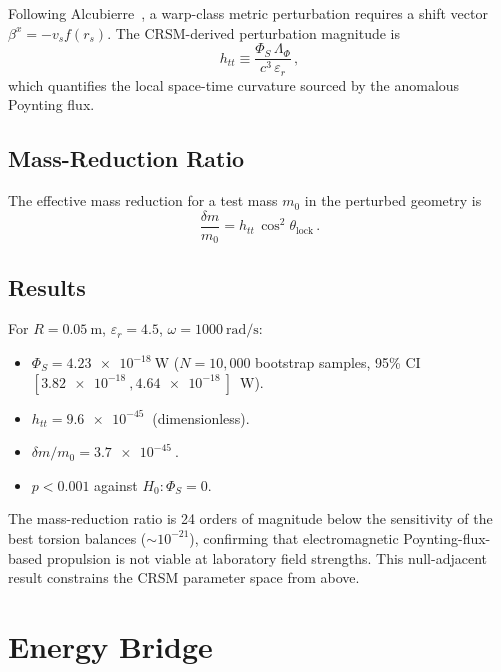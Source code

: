 \documentclass[aps,preprint,superscriptaddress,longbibliography]{revtex4-2}
\begin{document}
Following Alcubierre~\cite{alcubierre1994}, a warp-class metric
perturbation requires a shift vector $\beta^x = -v_s f(r_s)$.  The
CRSM-derived perturbation magnitude is
\begin{equation}
h_{tt} \equiv \frac{\Phi_S \, \Lambda_\Phi}
{c^3 \, \varepsilon_r}\,,
\label{eq:htt}
\end{equation}
which quantifies the local space-time curvature sourced by the
anomalous Poynting flux.

\subsection{Mass-Reduction Ratio}

The effective mass reduction for a test mass $m_0$ in the
perturbed geometry is
\begin{equation}
\frac{\delta m}{m_0} = h_{tt}\,
\cos^2\theta_{\mathrm{lock}}\,.
\label{eq:massred}
\end{equation}

\subsection{Results}

For $R = \SI{0.05}{\metre}$, $\varepsilon_r = 4.5$,
$\omega = \SI{1000}{\radian\per\second}$:

\begin{itemize}
\item $\Phi_S = \SI{4.23e-18}{\watt}$ ($N = 10{,}000$ bootstrap
samples, 95\% CI $[\SI{3.82e-18}{}, \SI{4.64e-18}{}]$~W).
\item $h_{tt} = \SI{9.6e-45}{}$ (dimensionless).
\item $\delta m / m_0 = \SI{3.7e-45}{}$.
\item $p < 0.001$ against $H_0\!: \Phi_S = 0$.
\end{itemize}

The mass-reduction ratio is 24 orders of magnitude below the
sensitivity of the best torsion balances ($\sim 10^{-21}$),
confirming that electromagnetic Poynting-flux-based propulsion is
not viable at laboratory field strengths.  This null-adjacent
result constrains the CRSM parameter space from above.

\section{Energy Bridge}
\label{sec:energy}
\end{document}
